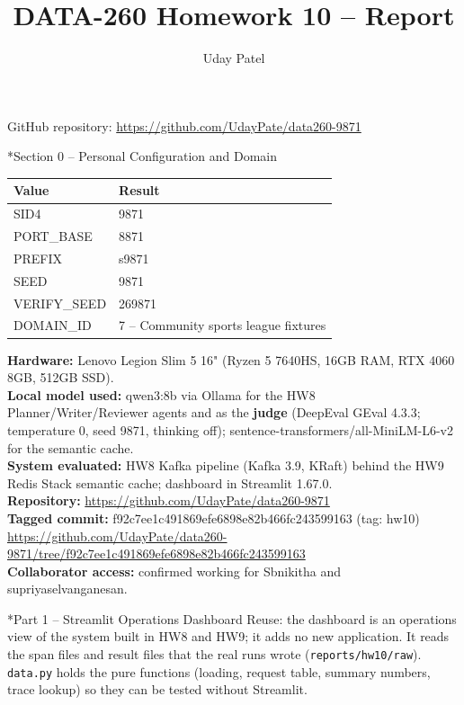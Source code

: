 \documentclass[11pt]{article}
\title{DATA-260 Homework 10 -- Report}
\author{Uday Patel}
\date{}
\makeatletter
\renewcommand\section{\@startsection{section}{1}{\z@}{-3.0ex \@plus -1ex \@minus -.2ex}{1.2ex \@plus.2ex}{\normalfont\fontsize{14}{17}\selectfont\bfseries}}
\makeatother
\begin{document}
\maketitle
\begin{center}GitHub repository: \url{https://github.com/UdayPate/data260-9871}\end{center}

\section*{Section 0 -- Personal Configuration and Domain}
\begin{tabular}{|l|l|}\hline
\textbf{Value} & \textbf{Result} \\\hline
SID4 & 9871 \\\hline
PORT\_BASE & 8871 \\\hline
PREFIX & s9871 \\\hline
SEED & 9871 \\\hline
VERIFY\_SEED & 269871 \\\hline
DOMAIN\_ID & 7 -- Community sports league fixtures \\\hline
\end{tabular}
\vspace{1em}

\textbf{Hardware:} Lenovo Legion Slim 5 16" (Ryzen 5 7640HS, 16GB RAM, RTX 4060 8GB, 512GB SSD). \\
\textbf{Local model used:} qwen3:8b via Ollama for the HW8 Planner/Writer/Reviewer agents and as the \textbf{judge} (DeepEval GEval 4.3.3; temperature 0, seed 9871, thinking off); sentence-transformers/all-MiniLM-L6-v2 for the semantic cache. \\
\textbf{System evaluated:} HW8 Kafka pipeline (Kafka 3.9, KRaft) behind the HW9 Redis Stack semantic cache; dashboard in Streamlit 1.67.0. \\
\textbf{Repository:} \url{https://github.com/UdayPate/data260-9871} \\
\textbf{Tagged commit:} f92c7ee1c491869efe6898e82b466fc243599163 (tag: hw10) \\
{\footnotesize\url{https://github.com/UdayPate/data260-9871/tree/f92c7ee1c491869efe6898e82b466fc243599163}} \\
\textbf{Collaborator access:} confirmed working for Sbnikitha and supriyaselvanganesan.

\section*{Part 1 -- Streamlit Operations Dashboard}
Reuse: the dashboard is an operations view of the system built in HW8 and HW9; it adds no new application. It reads the span files and result files that the real runs wrote (\texttt{reports/\allowbreak{}hw10/\allowbreak{}raw}). \texttt{data.py} holds the pure functions (loading, request table, summary numbers, trace lookup) so they can be tested without Streamlit.
\end{document}
